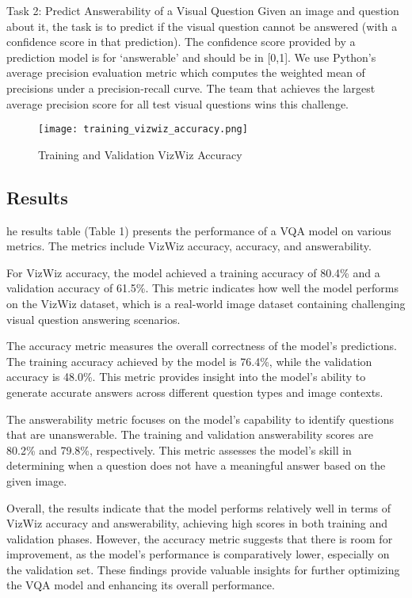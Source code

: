 \documentclass[final,5p,times,twocolumn,authoryear]{elsarticle}
\begin{document}
Task 2: Predict Answerability of a Visual Question
Given an image and question about it, the task is to predict if the visual question cannot be answered (with a confidence score in that prediction). The confidence score provided by a prediction model is for ‘answerable’ and should be in [0,1]. We use Python’s average precision evaluation metric which computes the weighted mean of precisions under a precision-recall curve. The team that achieves the largest average precision score for all test visual questions wins this challenge.

\begin{figure}
	\centering 
	\texttt{[image: training\_vizwiz\_accuracy.png]}	
	\caption{Training and Validation VizWiz Accuracy} 
	\label{fig_mom0}%
\end{figure}

\subsection{Results}
he results table (Table 1) presents the performance of a VQA model on various metrics. The metrics include VizWiz accuracy, accuracy, and answerability.

For VizWiz accuracy, the model achieved a training accuracy of 80.4\% and a validation accuracy of 61.5\%. This metric indicates how well the model performs on the VizWiz dataset, which is a real-world image dataset containing challenging visual question answering scenarios.

The accuracy metric measures the overall correctness of the model's predictions. The training accuracy achieved by the model is 76.4\%, while the validation accuracy is 48.0\%. This metric provides insight into the model's ability to generate accurate answers across different question types and image contexts.

The answerability metric focuses on the model's capability to identify questions that are unanswerable. The training and validation answerability scores are 80.2\% and 79.8\%, respectively. This metric assesses the model's skill in determining when a question does not have a meaningful answer based on the given image.

Overall, the results indicate that the model performs relatively well in terms of VizWiz accuracy and answerability, achieving high scores in both training and validation phases. However, the accuracy metric suggests that there is room for improvement, as the model's performance is comparatively lower, especially on the validation set. These findings provide valuable insights for further optimizing the VQA model and enhancing its overall performance.
\end{document}
